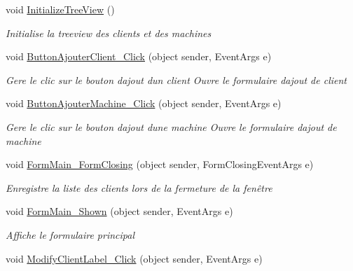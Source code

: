 \begin{DoxyCompactItemize}
\item 
void \mbox{\hyperlink{class_m_t_connect_agent_1_1_form_main_a90b43ceba6da9143b98ded12f0d31a5e}{Initialize\+Tree\+View}} ()
\begin{DoxyCompactList}\small\item\em Initialise la treeview des clients et des machines \end{DoxyCompactList}\item 
void \mbox{\hyperlink{class_m_t_connect_agent_1_1_form_main_a52a71c632c1f54d42d45e7220ed97923}{Button\+Ajouter\+Client\+\_\+\+Click}} (object sender, Event\+Args e)
\begin{DoxyCompactList}\small\item\em Gere le clic sur le bouton d\textquotesingle{}ajout d\textquotesingle{}un client Ouvre le formulaire d\textquotesingle{}ajout de client \end{DoxyCompactList}\item 
void \mbox{\hyperlink{class_m_t_connect_agent_1_1_form_main_aab7098479c86c56fc6b1bd57cc9fe7fc}{Button\+Ajouter\+Machine\+\_\+\+Click}} (object sender, Event\+Args e)
\begin{DoxyCompactList}\small\item\em Gere le clic sur le bouton d\textquotesingle{}ajout d\textquotesingle{}une machine Ouvre le formulaire d\textquotesingle{}ajout de machine \end{DoxyCompactList}\item 
void \mbox{\hyperlink{class_m_t_connect_agent_1_1_form_main_a7bf61fab117d7928a7f0cc0eca0d2189}{Form\+Main\+\_\+\+Form\+Closing}} (object sender, Form\+Closing\+Event\+Args e)
\begin{DoxyCompactList}\small\item\em Enregistre la liste des clients lors de la fermeture de la fenêtre \end{DoxyCompactList}\item 
void \mbox{\hyperlink{class_m_t_connect_agent_1_1_form_main_a6135a4be969947c0c26db758ba0acaed}{Form\+Main\+\_\+\+Shown}} (object sender, Event\+Args e)
\begin{DoxyCompactList}\small\item\em Affiche le formulaire principal \end{DoxyCompactList}\item 
void \mbox{\hyperlink{class_m_t_connect_agent_1_1_form_main_adf54b84f7d625d8656f6e6114c8da775}{Modify\+Client\+Label\+\_\+\+Click}} (object sender, Event\+Args e)

\end{DoxyCompactItemize}

